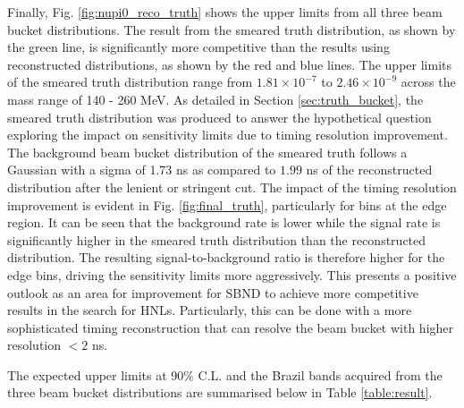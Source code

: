 Finally, Fig. \ref{fig:nupi0_reco_truth} shows the upper limits from all three beam bucket distributions.
The result from the smeared truth distribution, as shown by the green line, is significantly more competitive than the results using reconstructed distributions, as shown by the red and blue lines.
The upper limits of the smeared truth distribution range from $1.81 \times 10^{-7}$ to $2.46 \times 10^{-9}$ across the mass range of 140 - 260 MeV. 
As detailed in Section \ref{sec:truth_bucket}, the smeared truth distribution was produced to answer the hypothetical question exploring the impact on sensitivity limits due to timing resolution improvement. 
The background beam bucket distribution of the smeared truth follows a Gaussian with a sigma of 1.73 ns as compared to $1.99$ ns of the reconstructed distribution after the lenient or stringent cut.
The impact of the timing resolution improvement is evident in Fig. \ref{fig:final_truth}, particularly for bins at the edge region.
It can be seen that the background rate is lower while the signal rate is significantly higher in the smeared truth distribution than the reconstructed distribution.
The resulting signal-to-background ratio is therefore higher for the edge bins, driving the sensitivity limits more aggressively. 
This presents a positive outlook as an area for improvement for SBND to achieve more competitive results in the search for HNLs.
Particularly, this can be done with a more sophisticated timing reconstruction that can resolve the beam bucket with higher resolution $< 2$ ns.

The expected upper limits at 90\% C.L. and the Brazil bands acquired from the three beam bucket distributions are summarised below in Table \ref{table:result}.  

